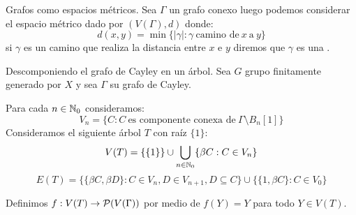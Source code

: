 \documentclass[aspectratio=169, 10pt]{beamer}
\begin{document}
	\begin{frame}[fragile]{Grafos como espacios métricos.}
		Sea $\Gamma$ un grafo conexo luego podemos considerar el espacio métrico dado por $(V(\Gamma), d)$ donde:
		\[
			d(x,y) = \min \{ |\gamma| : \gamma \ \text{camino de} \ x  \ \text{a} \ y  \}	
		\]
		\pause 
		si $\gamma$ es un camino que realiza la distancia entre $x$ e $y$ diremos que $\gamma$ es una .
		\pause 
	\end{frame}

	\begin{frame}[fragile]{Descomponiendo el grafo de Cayley en un árbol.}
		Sea $G$ grupo finitamente generado por $X$ y sea $\Gamma$ su grafo de Cayley.
		
		\pause 
		Para cada $n \in \mathbb{N}_{0}$ consideramos:
		\[
			V_{n} = \{C : C \ \text{es componente conexa de} \ \Gamma \setminus B_{n}[1]\}	
		\]
		\pause 
		Consideramos el siguiente árbol $T$ con raíz $\{1\}$:
		\pause 
		\[
			V(T) = \{ \{1\}\} \cup \bigcup_{n \in \mathbb{N}_{0}}  \{ \beta C : C \in V_{n} \}
		\]
		\pause 
		\[
			E(T) = \{ \{\beta C, \beta D\} : C \in V_{n}, D \in V_{n+1}, D \subseteq C\} \cup 
			\{ \{1, \beta C\} : C \in V_{0} \}
		\]
		\pause 
		
		Definimos $f: V(T) \to {\cal{P}}(V(\Gamma))$ por medio de $f(Y) = Y$ para todo $Y \in V(T)$.
		\pause 
		
		
	\end{frame}
\end{document}
